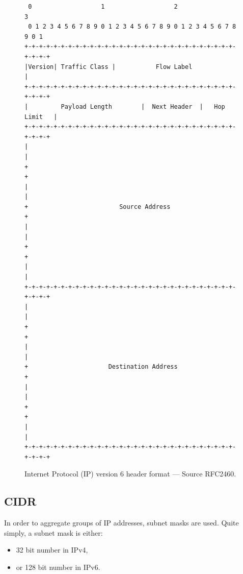\documentclass[pdftex,12pt,a4paper]{article}
\begin{document}
                \begin{figure}[tbh]
                    \centering
                    \begin{verbatim} 0                   1                   2                   3
 0 1 2 3 4 5 6 7 8 9 0 1 2 3 4 5 6 7 8 9 0 1 2 3 4 5 6 7 8 9 0 1
+-+-+-+-+-+-+-+-+-+-+-+-+-+-+-+-+-+-+-+-+-+-+-+-+-+-+-+-+-+-+-+-+
|Version| Traffic Class |           Flow Label                  |
+-+-+-+-+-+-+-+-+-+-+-+-+-+-+-+-+-+-+-+-+-+-+-+-+-+-+-+-+-+-+-+-+
|         Payload Length        |  Next Header  |   Hop Limit   |
+-+-+-+-+-+-+-+-+-+-+-+-+-+-+-+-+-+-+-+-+-+-+-+-+-+-+-+-+-+-+-+-+
|                                                               |
+                                                               +
|                                                               |
+                         Source Address                        +
|                                                               |
+                                                               +
|                                                               |
+-+-+-+-+-+-+-+-+-+-+-+-+-+-+-+-+-+-+-+-+-+-+-+-+-+-+-+-+-+-+-+-+
|                                                               |
+                                                               +
|                                                               |
+                      Destination Address                      +
|                                                               |
+                                                               +
|                                                               |
+-+-+-+-+-+-+-+-+-+-+-+-+-+-+-+-+-+-+-+-+-+-+-+-+-+-+-+-+-+-+-+-+\end{verbatim}
                    \caption{Internet Protocol (IP) version 6 header format --- Source
                    RFC2460.}
                    \label{fig:ipv6}
                \end{figure}

        \subsection{CIDR}
            In order to aggregate groups of IP addresses, subnet masks are
            used. Quite simply, a subnet mask is either:
            \begin{itemize}
                \item 32 bit number in IPv4,
                \item or 128 bit number in IPv6.
            \end{itemize}
\end{document}
